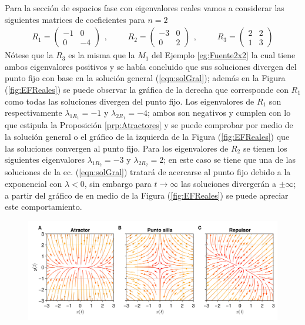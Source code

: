 \begin{ejemplo}\label{eg:EspaciosFreal}
	Para la sección de espacios fase con eigenvalores reales vamos a considerar las siguientes matrices de coeficientes para $n=2$
	\begin{equation*}
		\begin{split}
			R_1=\begin{pmatrix}
				-1 & 0\\
				0 & -4 
			\end{pmatrix}
		\end{split},\qquad
		\begin{split}
			R_2=\begin{pmatrix}
				-3 & 0\\
				0 & 2 			
			\end{pmatrix}
		\end{split},\qquad
		\begin{split}
			R_3=\begin{pmatrix}
					2 & 2\\
					1 & 3
			\end{pmatrix}
		\end{split}
	\end{equation*}
	Nótese que la $R_3$ es la misma que la $M_1$ del Ejemplo \ref{eg:Fuente2x2} la cual tiene ambos eigenvalores positivos y se había concluido que sus soluciones divergen del punto fijo con base en la solución general (\ref{eqn:solGral}); además en la Figura (\ref{fig:EFReales}) se puede observar la gráfica de la derecha que corresponde con $R_1$ como todas las soluciones divergen del punto fijo. Los eigenvalores de $R_1$ son respectivamente $\lambda_{1R_1}= -1$ y $\lambda_{2R_1}=-4$; ambos son negativos y cumplen con lo que estipula la Proposición \ref{prp:Atractores} y se puede comprobar por medio de la solución general o el gráfico de la izquierda de la Figura (\ref{fig:EFReales}) que las soluciones convergen al punto fijo. Para los eigenvalores de $R_2$ se tienen los siguientes eigenvalores $\lambda_{1R_2}=-3$ y $\lambda_{2R_2}=2$; en este caso se tiene que una de las soluciones de la ec. (\ref{eqn:solGral}) tratará de acercarse al punto fijo debido a la exponencial con $\lambda<0$, sin embargo para $t\to\infty$ las soluciones divergerán a $\pm\infty$; a partir del gráfico de en medio de la Figura (\ref{fig:EFReales}) se puede apreciar este comportamiento.
	\begin{figure}[h!]
		\centering
		\includegraphics[scale=0.23]{../Imagenes/Espacios fase reales}

\end{figure}
\end{ejemplo}
